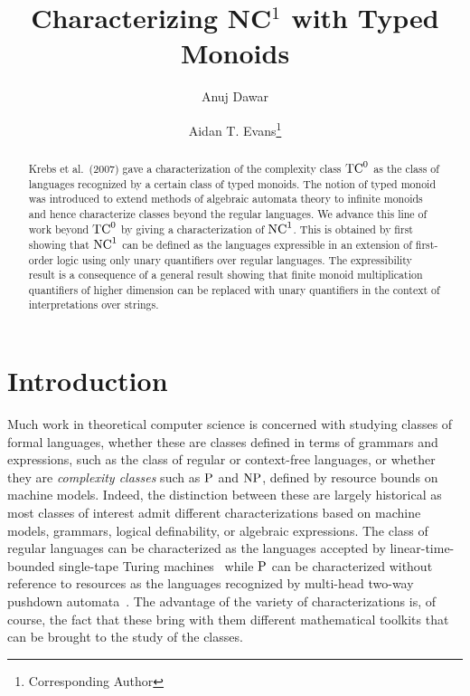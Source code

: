 \documentclass[a4paper,UKenglish,cleveref, autoref, thm-restate, anonymous]{lipics-v2021}
\title{Characterizing NC${}^1$ with Typed Monoids} %
\author{Anuj Dawar}{Department of Computer Science and Technology, University of Cambridge, United Kingdom \and \url{https://www.cl.cam.ac.uk/~ad260/} }{anuj.dawar@cl.cam.ac.uk}{https://orcid.org/0000-0003-4014-8248}{(Optional) author-specific funding acknowledgements}%
\author{Aidan T. Evans\footnote{Corresponding Author}}{Department of Computer Science and Technology, University of Cambridge, United Kingdom \and \url{https://www.aidantevans.com/} }{ate26@cam.ac.uk}{https://orcid.org/0009-0007-9084-3608}{[funding]}
\begin{document}


\maketitle

\begin{abstract}
Krebs et al.~(2007) gave a characterization of the complexity class $\mathrm{TC}^0$ as the class of languages recognized by a certain class of typed monoids.  The notion of typed monoid was introduced to extend methods of algebraic automata theory to infinite monoids and hence characterize classes beyond the regular languages.  We advance this line of work beyond $\mathrm{TC}^0$ by giving a characterization of $\mathrm{NC}^1$.  This is obtained by first showing that $\mathrm{NC}^1$ can be defined as the languages expressible in an extension of first-order logic using only unary quantifiers over regular languages.  The expressibility result is a consequence of a general result showing that finite monoid multiplication quantifiers of higher dimension can be replaced with unary quantifiers in the context of interpretations over strings.
\end{abstract}

\newpage

\section{Introduction}


Much work in theoretical computer science is concerned with studying classes of formal languages, whether these are classes defined in terms of grammars and expressions, such as the class of regular or context-free languages, or whether they are \emph{complexity classes} such as $\mathrm{P}$ and $\mathrm{NP}$, defined by resource bounds on machine models.  Indeed, the distinction between these are largely historical as most classes of interest admit different characterizations based on machine models, grammars, logical definability, or algebraic expressions. The class of regular languages can be characterized as the languages accepted by linear-time-bounded single-tape Turing machines~\cite{hennie1965one} while $\mathrm{P}$ can be characterized without reference to resources as the languages recognized by multi-head two-way pushdown automata~\cite{cook1971characterizations}.  The advantage of the variety of characterizations is, of course, the fact that these bring with them different mathematical toolkits that can be brought to the study of the classes.
\end{document}
